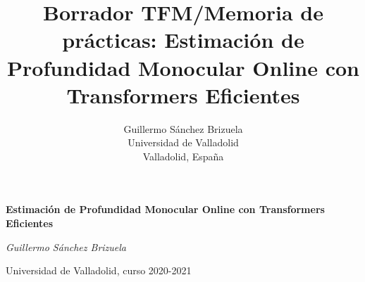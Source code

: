 \documentclass[a4paper, 11pt]{article}
\title{Borrador TFM/Memoria de prácticas: Estimación de Profundidad Monocular Online con Transformers Eficientes}
\author{Guillermo Sánchez Brizuela\\
  \small Universidad de Valladolid\\
  \small Valladolid, España
  \date{}
}
\begin{document}
\begin{titlepage}
\centering
	\vspace{6cm}
	{\huge\bfseries Estimación de Profundidad Monocular Online con Transformers Eficientes\par}
    \vspace{15cm}
	{\Large\itshape Guillermo Sánchez Brizuela\par}
	\vspace{0.5cm}
	{\Large Universidad de Valladolid, curso 2020-2021\par}
	\vfill
\end{titlepage}


{
    \setcounter{tocdepth}{4}
    \setcounter{secnumdepth}{4}
    \hypersetup{linkcolor=black}
    \tableofcontents
}

\newpage











% 

\clearpage

\clearpage
\end{document}
